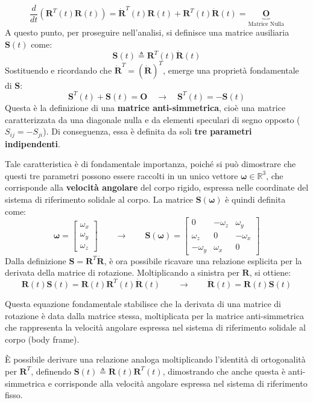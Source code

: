 \documentclass[11pt, a4paper]{report}
\begin{document}
\[
    \frac{d}{dt} \left( \bm{R}^T(t) \bm{R}(t) \right) = \dot{\bm{R}}^T(t) \bm{R}(t) + \bm{R}^T(t) \dot{\bm{R}}(t) = \underbrace{\bm{O}}_{\text{Matrice Nulla}}
\]
A questo punto, per proseguire nell'analisi, si definisce una matrice ausiliaria \(\bm{S}(t)\) come:
\[
    \bm{S}(t) \triangleq \bm{R}^T(t) \dot{\bm{R}}(t)
\]
Sostituendo e ricordando che \(\dot{\bm{R}}^T = (\dot{\bm{R}})^T\), emerge una proprietà fondamentale di \(\bm{S}\):
\[
    \bm{S}^T(t) + \bm{S}(t) = \bm{O} \quad \longrightarrow \quad \bm{S}^T(t) = -\bm{S}(t)
\]
Questa è la definizione di una \textbf{matrice anti-simmetrica}, cioè una matrice caratterizzata da una diagonale nulla e da elementi speculari di segno opposto (\(S_{ij} = -S_{ji}\)). Di conseguenza, essa è definita da soli \textbf{tre parametri indipendenti}.

Tale caratteristica è di fondamentale importanza, poiché si può dimostrare che questi tre parametri possono essere raccolti in un unico vettore \(\bm{\omega} \in \mathbb{R}^3\), che corrisponde alla \textbf{velocità angolare} del corpo rigido, espressa nelle coordinate del sistema di riferimento solidale al corpo. La matrice \(\bm{S}(\bm{\omega})\) è quindi definita come:
\[
    \bm{\omega} = \begin{bmatrix} \omega_x \\ \omega_y \\ \omega_z \end{bmatrix}
    \qquad \longrightarrow \qquad
    \bm{S}(\bm{\omega}) = \begin{bmatrix}
        0 & -\omega_z & \omega_y \\
        \omega_z & 0 & -\omega_x \\
        -\omega_y & \omega_x & 0
    \end{bmatrix}
\]
Dalla definizione \(\bm{S} = \bm{R}^T \dot{\bm{R}}\), è ora possibile ricavare una relazione esplicita per la derivata della matrice di rotazione. Moltiplicando a sinistra per \(\bm{R}\), si ottiene:
\[
    \bm{R}(t) \bm{S}(t) = \bm{R}(t) \bm{R}^T(t) \dot{\bm{R}}(t) \qquad \longrightarrow \qquad \dot{\bm{R}}(t) = \bm{R}(t) \bm{S}(t)
\]

Questa equazione fondamentale stabilisce che la derivata di una matrice di rotazione è data dalla matrice stessa, moltiplicata per la matrice anti-simmetrica che rappresenta la velocità angolare espressa nel sistema di riferimento solidale al corpo (body frame).

È possibile derivare una relazione analoga moltiplicando l'identità di ortogonalità per \(\bm{R}^T\), definendo \(\bm{S}(t) \triangleq \dot{\bm{R}}(t) \bm{R}^T(t)\), dimostrando che anche questa è anti-simmetrica e corrisponde alla velocità angolare espressa nel sistema di riferimento fisso.
\end{document}
